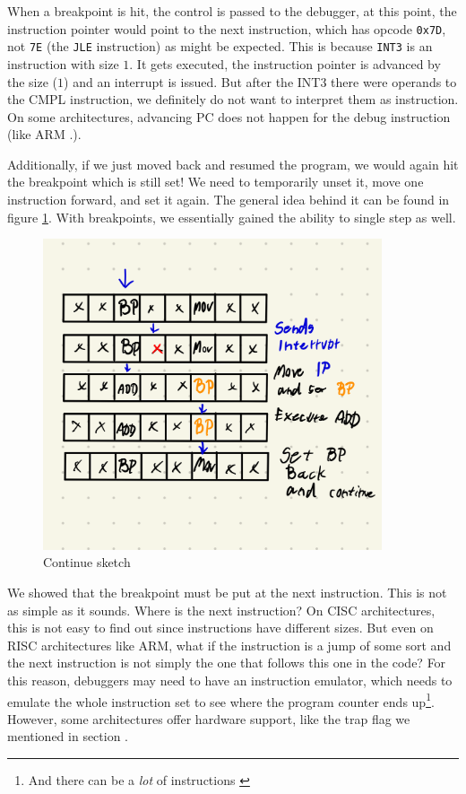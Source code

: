 When a breakpoint is hit, the control is passed to the debugger, at this point,
the instruction pointer would point to the next instruction, which has opcode
\texttt{0x7D}, not \texttt{7E} (the \texttt{JLE} instruction) as might be
expected. This is because \texttt{INT3} is an instruction with size $1$. It
gets executed, the instruction pointer is advanced by the size ($1$) and an
interrupt is issued. But after the INT3 there were operands to the CMPL
instruction, we definitely do not want to interpret them as instruction. On
some architectures, advancing PC does not happen for the debug instruction
(like ARM .).

Additionally, if we just moved back and resumed the program, we would again hit
the breakpoint which is still set! We need to temporarily unset it, move one
instruction forward, and set it again. The general idea behind it can be found
in figure \ref{fig:continue}. With breakpoints, we essentially gained the
ability to single step as well. 

\begin{figure}\label{fig:continue}
    \centering
    \includegraphics[width=100mm,scale=0.5]{media/breakpoint_tbd}
    \caption{Continue sketch}
\end{figure}

We showed that the breakpoint must be put at the next instruction. This is not
as simple as it sounds. Where is the next instruction? On CISC architectures,
this is not easy to find out since instructions have different sizes. But even
on RISC architectures like ARM, what if the instruction is a jump of some sort
and the next instruction is not simply the one that follows this one in the
code? For this reason, debuggers may need to have an instruction emulator,
which needs to emulate the whole instruction set to see where the program
counter ends up\footnote{And there can be a \textit{lot} of instructions
\cite{intel-manual}}. However, some architectures offer hardware support, like
the trap flag we mentioned in section .

